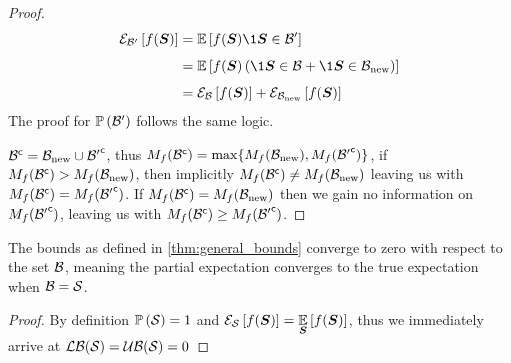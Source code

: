 \begin{proof}
	\begin{align*}
		\partialexpectation{f(\RV)}{\subSpace^\prime} & =\expectation{f(\RV)\1{\RV\in\subSpace^\prime}}{}\\
		& =\expectation{f(\RV)\left(\1{\RV\in\subSpace}+\1{\RV\in\subSpace_{\textrm{\textup{new}}}}\right)}{}\\
		& =\partialexpectation{f(\RV)}{\subSpace}+\partialexpectation{f(\RV)}{\subSpace_{\textrm{\textup{new}}}}
	\end{align*}
	The proof for $\mathbb{P}\left({\mathcal B^\prime}\right)$ follows the same logic.

	${\mathcal B}^{\mathsf{c}}=\mathcal B_{\textrm{\textup{new}}}\cup{\ensuremath{\mathcal B}^\prime}^{\mathsf{c}}$, thus $M_f({\mathcal B}^{\mathsf{c}})=\max\{M_f(\mathcal B_{\textrm{\textup{new}}}),M_f({\mathcal B^\prime}^{\mathsf{c}})\}$, if $M_f({\mathcal B}^{\mathsf{c}})>M_f(\mathcal B_{\textrm{\textup{new}}})$, then implicitly $M_f({\mathcal B}^{\mathsf{c}})\neq M_f(\mathcal B_{\textrm{\textup{new}}})$ leaving us with $M_f({\mathcal B}^{\mathsf{c}})=M_f({\mathcal B^\prime}^{\mathsf{c}})$. If $M_f({\mathcal B}^{\mathsf{c}})=M_f(\mathcal B_{\textrm{\textup{new}}})$ then we gain no information on $M_f({\mathcal B^\prime}^{\mathsf{c}})$, leaving us with $M_f({\mathcal B}^{\mathsf{c}})\geq M_f({\mathcal B^\prime}^{\mathsf{c}})$.
\end{proof}


\begin{corollary}[Convergence]
	\label{thm:convergence}
	The bounds as defined in \cref{thm:general_bounds} converge to zero with respect to the set $\mathcal B$, meaning the partial expectation converges to the true expectation when $\mathcal B=\mathcal S$.
\end{corollary}
\begin{proof}
	By definition $\mathbb{P}\left({\mathcal S}\right)=1$ and $\mathcal{E}_{\mathcal S}\left[{f(\boldsymbol S)}\right]=\operatorname*{\mathbb{E}}\limits_{\boldsymbol S}\left[{f(\boldsymbol S)}\right]$, thus we immediately arrive at $\operatorname*{\mathcal{LB}}(\mathcal S)=\operatorname*{\mathcal{UB}}(\mathcal S)=0$
\end{proof}

